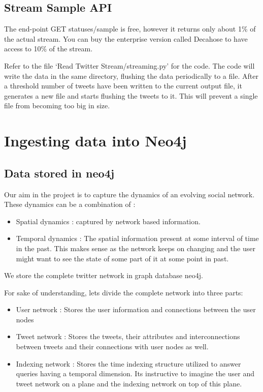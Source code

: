 \documentclass[letterpaper,10pt,english]{sphinxmanual}
\begin{document}
\section{Stream Sample API}
\label{\detokenize{twitter_stream:stream-sample-api}}
The end-point GET statuses/sample is free, however it returns only about 1\% of the actual stream. You can buy the enterprise version called Decahose to have access to 10\% of the stream.

Refer to the file ‘Read Twitter Stream/streaming.py’ for the code. The code will write the data in the same directory, flushing the data periodically to a file. After a threshold number of tweets have been written to the current output file, it generates a new file and starts flushing the tweets to it. This will prevent a single file from becoming too big in size.


\chapter{Ingesting data into Neo4j}
\label{\detokenize{neo4j_data_ingestion:ingesting-data-into-neo4j}}\label{\detokenize{neo4j_data_ingestion::doc}}

\section{Data stored in neo4j}
\label{\detokenize{neo4j_data_ingestion:data-stored-in-neo4j}}
Our aim in the project is to capture the dynamics of an evolving social network. These dynamics can be a combination of :
\begin{itemize}
\item {} 
Spatial dynamics : captured by network based information.

\item {} 
Temporal dynamics : The spatial information present at some interval of time in the past. This makes sense as the network keeps on changing and the user might want to see the state of some part of it at some point in past.

\end{itemize}

We store the complete twitter network in graph database neo4j.

For sake of understanding, lets divide the complete network into three parts:
\begin{itemize}
\item {} 
User network : Stores the user information and connections between the user nodes

\item {} 
Tweet network : Stores the tweets, their attributes and interconnections between tweets and their connections with user nodes as well.

\item {} 
Indexing network : Stores the time indexing structure utilized to answer queries having a temporal dimension. Its instructive to imagine the user and tweet network on a plane and the indexing network on top of this plane.

\end{itemize}
\end{document}
